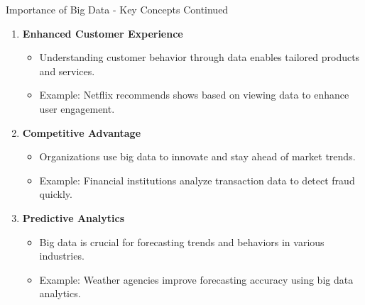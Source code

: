 \documentclass[aspectratio=169]{beamer}
\begin{document}
\begin{frame}[fragile]{Importance of Big Data - Key Concepts Continued}
  \begin{enumerate}[resume]
    \item \textbf{Enhanced Customer Experience}
      \begin{itemize}
        \item Understanding customer behavior through data enables tailored products and services.
        \item Example: Netflix recommends shows based on viewing data to enhance user engagement.
      \end{itemize}

    \item \textbf{Competitive Advantage}
      \begin{itemize}
        \item Organizations use big data to innovate and stay ahead of market trends.
        \item Example: Financial institutions analyze transaction data to detect fraud quickly.
      \end{itemize}
    
    \item \textbf{Predictive Analytics}
      \begin{itemize}
        \item Big data is crucial for forecasting trends and behaviors in various industries.
        \item Example: Weather agencies improve forecasting accuracy using big data analytics.
      \end{itemize}
  \end{enumerate}
\end{frame}
\end{document}
